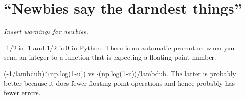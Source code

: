 \chapter{``Newbies say the darndest things''}

\begin{fullwidth}
{\em Insert  warnings for newbies.}

-1/2 is -1 and 1/2 is 0 in Python.  There is no automatic promotion when you send an integer to a function that is expecting a floating-point number.

(-1/lambduh)*(np.log(1-u)) vs -(np.log(1-u))/lambduh. The latter is probably better because it does fewer floating-point operations and hence probably has fewer errors.

\end{fullwidth}
